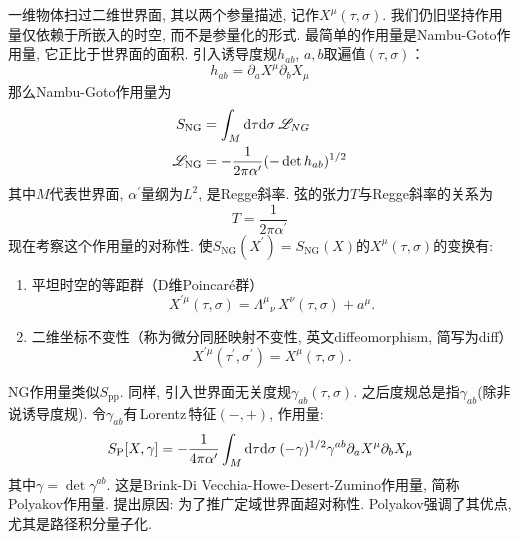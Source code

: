 一维物体扫过二维世界面, 其以两个参量描述, 记作$X^\mu(\tau,\sigma)$. 我们仍旧坚持作用量仅依赖于所嵌入的时空, 而不是参量化的形式. 最简单的作用量是Nambu-Goto作用量, 它正比于世界面的面积. 引入诱导度规$h_{ab}$, $a,b$取遍值$(\tau,\sigma)$：
\begin{equation}
h_{ab}=\partial_a X^\mu\partial_b X_\mu
\end{equation}
那么Nambu-Goto作用量为
\begin{subequations} \label{1.2.9} %
\begin{align}
S_{\mathrm{NG}}&=\int_M \mathrm{d}\tau \mathrm{d}\sigma\: \mathscr{L}_{NG} \\
\mathscr{L}_{\mathrm{NG}}&=-\frac{1}{2\pi\alpha^\prime}(-\det h_{ab})^{1/2}
\end{align} 
\end{subequations}
其中$M$代表世界面, $\alpha^\prime$量纲为$L^2$, 是Regge斜率. 弦的张力$T$与Regge斜率的关系为
\begin{equation}
T=\frac{1}{2\pi\alpha^\prime}
\end{equation}
现在考察这个作用量的对称性. 使$S_{\mathrm{NG}}(X^\prime)=S_{\mathrm{NG}}(X)$的$X^\mu(\tau,\sigma)$的变换有:
\begin{enumerate}
    \item 平坦时空的等距群（D维Poincar\'{e}群）
    \begin{equation}
    X^{\prime \mu}(\tau,\sigma)=\Lambda^{\mu}{}_{\nu} \,X^\nu(\tau,\sigma)+a^\mu.
    \end{equation}
    \item 二维坐标不变性（称为微分同胚映射不变性, 英文diffeomorphism, 简写为diff）
    \begin{equation}
    X^{\prime \mu}(\tau^\prime,\sigma^\prime)=X^{\mu}(\tau,\sigma). \label{diffeomorphism}
    \end{equation}
\end{enumerate}

NG作用量类似$S_{\mathrm{pp}}$. 同样, 引入世界面无关度规$\gamma_{ab}(\tau,\sigma)$. 之后度规总是指$\gamma_{ab}$(除非说诱导度规). 
令$\gamma_{ab}$有\,Lorentz\,特征$(-,+)$, 作用量:
\begin{equation}
S_{\mathrm{P}}[X,\gamma]=-\frac{1}{4\pi\alpha^\prime}\int_M \mathrm{d}\tau\mathrm{d}\sigma\: (-\gamma)^{1/2}\gamma^{ab}\partial_a X^\mu\partial_b X_\mu 
\label{1.2.13}
\end{equation}
其中$\gamma=\det\gamma^{ab}$. 这是Brink-Di Vecchia-Howe-Desert-Zumino作用量, 简称Polyakov作用量. 提出原因: 为了推广定域世界面超对称性. Polyakov强调了其优点, 尤其是路径积分量子化. 

